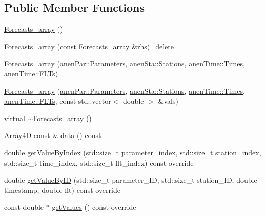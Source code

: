 \subsection*{Public Member Functions}
\begin{DoxyCompactItemize}
\item 
\mbox{\hyperlink{class_forecasts__array_a4304d0d78a0c475b3392c99e14c0891b}{Forecasts\+\_\+array}} ()
\item 
\mbox{\hyperlink{class_forecasts__array_a46a39594c6bc4f9b08ef3ff752147695}{Forecasts\+\_\+array}} (const \mbox{\hyperlink{class_forecasts__array}{Forecasts\+\_\+array}} \&rhs)=delete
\item 
\mbox{\hyperlink{class_forecasts__array_a7102efd52c1ed471ac9d05960e73e4a0}{Forecasts\+\_\+array}} (\mbox{\hyperlink{classanen_par_1_1_parameters}{anen\+Par\+::\+Parameters}}, \mbox{\hyperlink{classanen_sta_1_1_stations}{anen\+Sta\+::\+Stations}}, \mbox{\hyperlink{classanen_time_1_1_times}{anen\+Time\+::\+Times}}, \mbox{\hyperlink{classanen_time_1_1_f_l_ts}{anen\+Time\+::\+F\+L\+Ts}})
\item 
\mbox{\hyperlink{class_forecasts__array_ac50579e66269d92ebdbc4dc1ea07f7c8}{Forecasts\+\_\+array}} (\mbox{\hyperlink{classanen_par_1_1_parameters}{anen\+Par\+::\+Parameters}}, \mbox{\hyperlink{classanen_sta_1_1_stations}{anen\+Sta\+::\+Stations}}, \mbox{\hyperlink{classanen_time_1_1_times}{anen\+Time\+::\+Times}}, \mbox{\hyperlink{classanen_time_1_1_f_l_ts}{anen\+Time\+::\+F\+L\+Ts}}, const std\+::vector$<$ double $>$ \&vals)
\item 
virtual \mbox{\hyperlink{class_forecasts__array_a7e13cb82b1ab76a45946cff992c7fff4}{$\sim$\+Forecasts\+\_\+array}} ()
\item 
\mbox{\hyperlink{class_array4_d}{Array4D}} const  \& \mbox{\hyperlink{class_forecasts__array_a989f43aa5d819b50ddd8df5a2f33129d}{data}} () const
\item 
double \mbox{\hyperlink{class_forecasts__array_ad37886d56310b642647c54d634e447a1}{get\+Value\+By\+Index}} (std\+::size\+\_\+t parameter\+\_\+index, std\+::size\+\_\+t station\+\_\+index, std\+::size\+\_\+t time\+\_\+index, std\+::size\+\_\+t flt\+\_\+index) const override
\item 
double \mbox{\hyperlink{class_forecasts__array_a9ff105a7f87ceed5aaa6f32d438d82ef}{get\+Value\+By\+ID}} (std\+::size\+\_\+t parameter\+\_\+\+ID, std\+::size\+\_\+t station\+\_\+\+ID, double timestamp, double flt) const override
\item 
const double $\ast$ \mbox{\hyperlink{class_forecasts__array_a5b8a91680acc4969aeb968b4f4a35a73}{get\+Values}} () const override

\end{DoxyCompactItemize}
